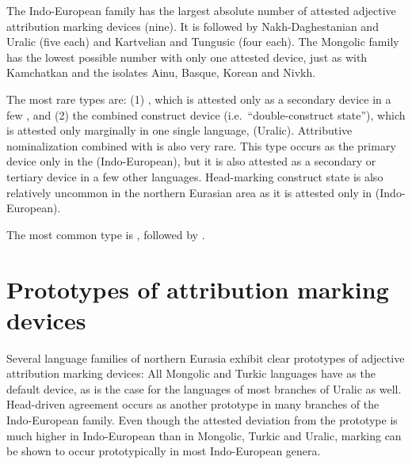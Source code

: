 The Indo-European family has the largest absolute number of attested adjective attribution marking devices (nine). It is followed by Nakh-Daghestanian and Uralic (five each) and Kartvelian and Tungusic (four each). The Mongolic family has the lowest possible number with only one attested device, just as with Kamchatkan and the isolates Ainu, Basque, Korean and Nivkh.

The most rare types are: (1) , which is attested only as a secondary device in a few , and (2) the combined construct device (i.e.~“double\hyp{}construct state”), which is attested only marginally in one single language,  (Uralic). Attributive nominalization combined  with  is also very rare. This type occurs as the primary device only in the  (Indo-European), but it is also attested as a secondary or tertiary device in a few other languages. Head-marking construct state is also relatively uncommon in the northern Eurasian area as it is attested only in  (Indo-European).

The most common type is , followed by .

\section{Prototypes of attribution marking devices}
Several language families of northern Eurasia exhibit clear prototypes of adjective attribution marking devices: All Mongolic and Turkic languages have  as the default device, as is the case for the languages of most branches of Uralic as well. Head\hyp{}driven agreement occurs as another prototype in many branches of the Indo-European family. Even though the attested deviation from the prototype is much higher in Indo-European than in Mongolic, Turkic and Uralic,  marking can be shown to occur prototypically in most Indo-European genera.

